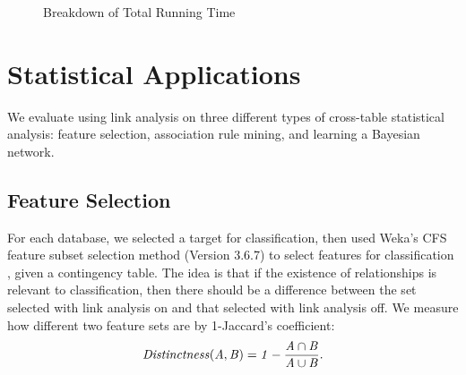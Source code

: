 \documentclass{acm_proc_article-sp}
\begin{document}
\begin{figure}[htbp]
\begin{center}

\caption{Breakdown of \MJ Total Running Time
\label{fig:breakdown-vj}}
\end{center}
\end{figure}



\section{Statistical Applications}
We evaluate using link analysis on three different types of cross-table statistical analysis: feature selection, association rule  mining, and learning a Bayesian network.

\subsection{Feature Selection} For each database, we selected a target for classification, then used Weka's CFS feature subset selection method (Version 3.6.7) to select features for classification \cite{Hall2009}, given a contingency table. The idea is that if the existence of relationships is relevant to classification, then there should be a difference between the set selected with link analysis on and that selected with link analysis off. 
We measure how different two feature sets are by 1-Jaccard's coefficient:
$$\it{Distinctness}(A,B) = 1- \frac{A \cap B}{A \cup B}.$$
\end{document}
